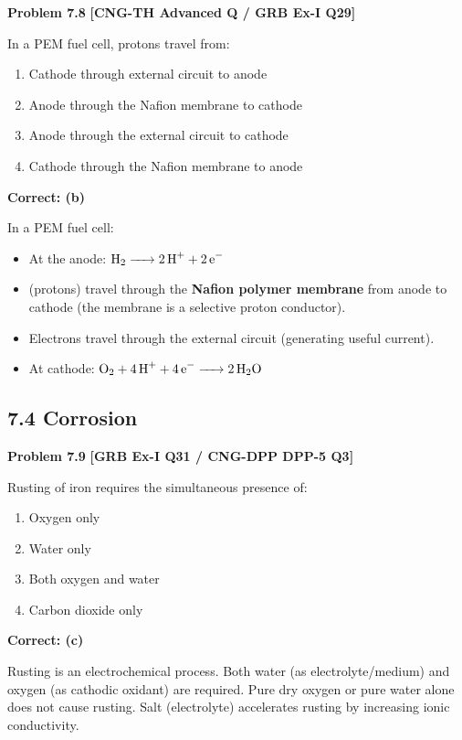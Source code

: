 \begin{problembox}
\textbf{Problem 7.8} \hfill \textbf{[CNG-TH Advanced Q / GRB Ex-I Q29]}

In a PEM fuel cell, protons travel from:
\begin{enumerate}[label=(\alph*)]
    \item Cathode through external circuit to anode
    \item Anode through the Nafion membrane to cathode
    \item Anode through the external circuit to cathode
    \item Cathode through the Nafion membrane to anode
\end{enumerate}
\end{problembox}
\begin{solution}
\textbf{Correct: (b)}

In a PEM fuel cell:
\begin{itemize}
    \item At the anode: $\ce{H2 -> 2H+ + 2e-}$
    \item {} (protons) travel through the \textbf{Nafion polymer membrane} from anode to cathode (the membrane is a selective proton conductor).
    \item Electrons travel through the external circuit (generating useful current).
    \item At cathode: $\ce{O2 + 4H+ + 4e- -> 2H2O}$
\end{itemize}
\end{solution}

\subsection{7.4 Corrosion}

\begin{problembox}
\textbf{Problem 7.9} \hfill \textbf{[GRB Ex-I Q31 / CNG-DPP DPP-5 Q3]}

Rusting of iron requires the simultaneous presence of:
\begin{enumerate}[label=(\alph*)]
    \item Oxygen only
    \item Water only
    \item Both oxygen and water
    \item Carbon dioxide only
\end{enumerate}
\end{problembox}
\begin{solution}
\textbf{Correct: (c)}

Rusting is an electrochemical process. Both water (as electrolyte/medium) and oxygen (as cathodic oxidant) are required. Pure dry oxygen or pure water alone does not cause rusting. Salt (electrolyte) accelerates rusting by increasing ionic conductivity.
\end{solution}


